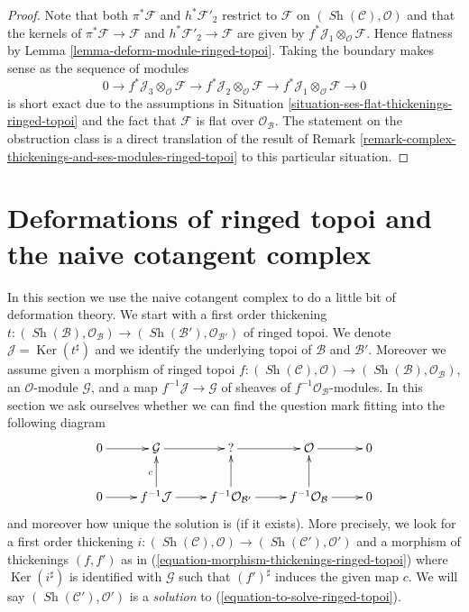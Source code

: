 \documentclass{stacks-project}
\theoremstyle{plain}
\theoremstyle{definition}
\theoremstyle{remark}
\numberwithin{equation}{subsection}
\def\Sh{\mathop{\mathit{Sh}}\nolimits}
\def\Ker{\mathop{\mathrm{Ker}}}
\begin{document}
\begin{proof}
Note that both $\pi^*\mathcal{F}$ and $h^*\mathcal{F}'_2$
restrict to $\mathcal{F}$ on $(\Sh(\mathcal{C}), \mathcal{O})$
and that the kernels of
$\pi^*\mathcal{F} \to \mathcal{F}$ and $h^*\mathcal{F}'_2 \to \mathcal{F}$
are given by $f^*\mathcal{J}_1 \otimes_\mathcal{O} \mathcal{F}$.
Hence flatness by Lemma \ref{lemma-deform-module-ringed-topoi}.
Taking the boundary makes sense as the sequence of modules
$$
0 \to f^*\mathcal{J}_3 \otimes_\mathcal{O} \mathcal{F} \to
f^*\mathcal{J}_2 \otimes_\mathcal{O} \mathcal{F} \to
f^*\mathcal{J}_1 \otimes_\mathcal{O} \mathcal{F} \to 0
$$
is short exact due to the assumptions in
Situation \ref{situation-ses-flat-thickenings-ringed-topoi}
and the fact that $\mathcal{F}$ is flat over $\mathcal{O}_\mathcal{B}$.
The statement on the obstruction class is a direct translation
of the result of
Remark \ref{remark-complex-thickenings-and-ses-modules-ringed-topoi}
to this particular situation.
\end{proof}







\section{Deformations of ringed topoi and the naive cotangent complex}
\label{section-deformations-ringed-topoi}

\noindent
In this section we use the naive cotangent complex to do a little bit
of deformation theory. We start with a first order thickening
$t : (\Sh(\mathcal{B}), \mathcal{O}_\mathcal{B}) \to
(\Sh(\mathcal{B}'), \mathcal{O}_{\mathcal{B}'})$ of ringed topoi.
We denote $\mathcal{J} = \Ker(t^\sharp)$ and we
identify the underlying topoi of $\mathcal{B}$ and $\mathcal{B}'$.
Moreover we assume given a morphism of ringed topoi
$f : (\Sh(\mathcal{C}), \mathcal{O}) \to
(\Sh(\mathcal{B}), \mathcal{O}_\mathcal{B})$, an $\mathcal{O}$-module
$\mathcal{G}$, and a map $f^{-1}\mathcal{J} \to \mathcal{G}$
of sheaves of $f^{-1}\mathcal{O}_\mathcal{B}$-modules.
In this section we ask ourselves whether we can find
the question mark fitting into the following diagram
\begin{equation}
\label{equation-to-solve-ringed-topoi}
\vcenter{
\xymatrix{
0 \ar[r] & \mathcal{G} \ar[r] & {?} \ar[r] & \mathcal{O} \ar[r] & 0 \\
0 \ar[r] & f^{-1}\mathcal{J} \ar[u]^c \ar[r] &
f^{-1}\mathcal{O}_{\mathcal{B}'} \ar[u] \ar[r] &
f^{-1}\mathcal{O}_\mathcal{B} \ar[u] \ar[r] & 0
}
}
\end{equation}
and moreover how unique the solution is (if it exists). More precisely,
we look for a first order thickening
$i : (\Sh(\mathcal{C}), \mathcal{O}) \to (\Sh(\mathcal{C}'), \mathcal{O}')$
and a morphism of thickenings $(f, f')$ as in
(\ref{equation-morphism-thickenings-ringed-topoi})
where $\Ker(i^\sharp)$ is identified with $\mathcal{G}$
such that $(f')^\sharp$ induces the given map $c$.
We will say $(\Sh(\mathcal{C}'), \mathcal{O}')$ is a {\it solution} to
(\ref{equation-to-solve-ringed-topoi}).
\end{document}
